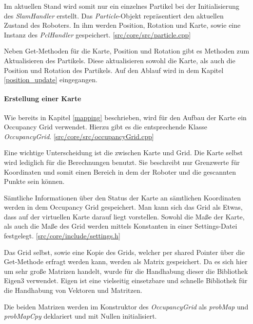 Im aktuellen Stand wird somit nur ein einzelnes Partikel bei der Initialisierung des \textit{SlamHandler} erstellt.
Das \textit{Particle}-Objekt repräsentiert den aktuellen Zustand des Roboters.
In ihm werden Position, Rotation und Karte, sowie eine Instanz des \textit{PclHandler} gespeichert.
[\href{https://github.com/Jundy0/Studienarbeit/blob/main/src/core/src/particle.cpp}{src/core/src/particle.cpp}]

Neben Get-Methoden für die Karte, Position und Rotation gibt es Methoden zum Aktualisieren des Partikels.
Diese aktualisieren sowohl die Karte, als auch die Position und Rotation des Partikels.
Auf den Ablauf wird in dem Kapitel \ref{position_update} eingegangen.

\paragraph{Erstellung einer Karte}
Wie bereits in Kapitel \ref{mapping} beschrieben, wird für den Aufbau der Karte ein Occupancy Grid verwendet.
Hierzu gibt es die entsprechende Klasse \textit{OccupancyGrid}.
[\href{https://github.com/Jundy0/Studienarbeit/blob/main/src/core/src/occupancyGrid.cpp}{src/core/src/occupancyGrid.cpp}]

Eine wichtige Unterscheidung ist die zwischen Karte und Grid.
Die Karte selbst wird lediglich für die Berechnungen benutzt.
Sie beschreibt nur Grenzwerte für Koordinaten und somit einen Bereich in dem der Roboter und die gescannten Punkte sein können.

Sämtliche Informationen über den Status der Karte an sämtlichen Koordinaten werden in dem Occupancy Grid gespeichert.
Man kann sich das Grid als Etwas, dass auf der virtuellen Karte darauf liegt vorstellen.
Sowohl die Maße der Karte, als auch die Maße des Grid werden mittels Konstanten in einer Settings-Datei festgelegt.
[\href{https://github.com/Jundy0/Studienarbeit/blob/main/src/core/include/settings.h}{src/core/include/settings.h}]

Das Grid selbst, sowie eine Kopie des Grids, welcher per shared Pointer über die Get-Methode erfragt werden kann, werden als Matrix gespeichert.
Da es sich hier um sehr große Matrizen handelt, wurde für die Handhabung dieser die Bibliothek Eigen3 verwendet.
Eigen ist eine vielseitig einsetzbare und schnelle Bibliothek für die Handhabung von Vektoren und Matritzen.

Die beiden Matrizen werden im Konstruktor des \textit{OccupancyGrid} als \textit{probMap} und \textit{probMapCpy} deklariert und mit Nullen initialisiert.
\newline


